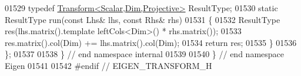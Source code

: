\begin{DoxyCode}
01529   \textcolor{keyword}{typedef} \hyperlink{group___geometry___module_class_eigen_1_1_transform}{Transform<Scalar,Dim,Projective>} ResultType;
01530   \textcolor{keyword}{static} ResultType run(\textcolor{keyword}{const} Lhs& lhs, \textcolor{keyword}{const} Rhs& rhs)
01531   \{
01532     ResultType res(lhs.matrix().template leftCols<Dim>() * rhs.matrix());
01533     res.matrix().col(Dim) += lhs.matrix().col(Dim);
01534     \textcolor{keywordflow}{return} res;
01535   \}
01536 \};
01537 
01538 \} \textcolor{comment}{// end namespace internal}
01539 
01540 \} \textcolor{comment}{// end namespace Eigen}
01541 
01542 \textcolor{preprocessor}{#endif // EIGEN\_TRANSFORM\_H}
\end{DoxyCode}
